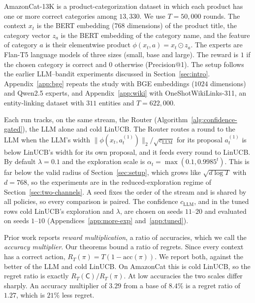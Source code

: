 \documentclass[anon]{alt2027} %
\newif\ifrevmarks\revmarkstrue
\newenvironment{revised}{\ifrevmarks\color{revcolor}\fi}{}
\newcommand{\Cold}{\mathsf{C}}
\begin{document}
\begin{revised}
AmazonCat-13K \citep{bhatia2016extreme} is a product-categorization dataset
in which each product has one or more correct categories among $13{,}330$.
We use $T=50{,}000$ rounds. The context $x_t$ is the BERT embedding
($768$ dimensions) of the product title, the category vector $z_a$ is the
BERT embedding of the category name, and the feature of category $a$ is
their elementwise product $\phi(x_t,a)=x_t\odot z_a$. The experts are
Flan-T5 language models of three sizes (small, base and large). The reward
is $1$ if the chosen category is correct and $0$ otherwise (Precision@1).
The setup follows the earlier LLM--bandit experiments discussed in
Section~\ref{sec:intro}. Appendix~\ref{app:bge} repeats the study with BGE
embeddings ($1024$ dimensions) and Qwen2.5 experts, and
Appendix~\ref{app:wiki} with OneShotWikiLinks-311, an entity-linking dataset
with $311$ entities and $T=622{,}000$.

Each run tracks, on the same stream, the Router
(Algorithm~\ref{alg:confidence-gated}), the LLM alone and cold LinUCB. The
Router routes a round to the LLM when the LLM's width
$\|\phi(x_t,a_t^{(1)})\|_2/\sqrt{c_{\mathrm{LLM}}}$ for its proposal
$a_t^{(1)}$ is below LinUCB's width for its own proposal, and it feeds every
round to LinUCB. By default $\lambda=0.1$ and the exploration scale is
$\alpha_t=\max(0.1,0.9985^t)$. This is far below the valid radius of
Section~\ref{sec:setup}, which grows like $\sqrt{d\log T}$ with $d=768$, so
the experiments are in the reduced-exploration regime of
Section~\ref{sec:two-channels}. A seed fixes the order of the stream and is
shared by all policies, so every comparison is paired. The confidence
$c_{\mathrm{LLM}}$, and in the tuned rows cold LinUCB's exploration and
$\lambda$, are chosen on seeds $11$--$20$ and evaluated on seeds $1$--$10$
(Appendices~\ref{app:more-exp} and~\ref{app:tuned}).

Prior work reports \emph{reward multiplication}, a ratio of accuracies,
which we call the \emph{accuracy multiplier}. Our theorems bound a ratio of
regrets. Since every context has a correct action,
$R_T(\pi)=T(1-\mathrm{acc}(\pi))$. We report both, against the better of the
LLM and cold LinUCB. On AmazonCat this is cold LinUCB, so the regret ratio is
exactly $R_T(\Cold)/R_T(\pi)$. At low accuracies the two scales differ
sharply. An accuracy multiplier of $3.29$ from a base of $8.4\%$ is a regret
ratio of $1.27$, which is $21\%$ less regret.
\end{revised}
\end{document}
